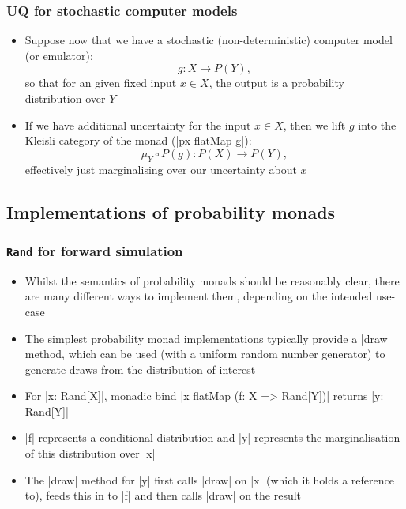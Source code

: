 \documentclass[mathserif,handout]{beamer}
\begin{document}
\begin{frame}[fragile]
  \frametitle{UQ for stochastic computer models}
  \begin{itemize}
  \item Suppose now that we have a stochastic (non-deterministic) computer model (or emulator):
    \[
g: X \longrightarrow P(Y),
\]
so that for an given fixed input $x\in X$, the output is a probability distribution over $Y$
\item If we have additional uncertainty for the input $x\in X$, then we lift $g$ into the Kleisli category of the monad (|px flatMap g|):
  \[
  \mu_Y\circ P(g): P(X) \longrightarrow P(Y),
  \]
  effectively just marginalising over our uncertainty about $x$
  \end{itemize}
\end{frame}

\subsection{Implementations of probability monads}

\begin{frame}[fragile]
  \frametitle{\texttt{Rand} for forward simulation}
  \begin{itemize}
    \item Whilst the semantics of probability monads should be reasonably clear, there are many different ways to implement them, depending on the intended use-case
  \item The simplest probability monad implementations typically provide a |draw| method, which can be used (with a uniform random number generator) to generate draws from the distribution of interest
  \item For |x: Rand[X]|, monadic bind |x flatMap (f: X => Rand[Y])| returns |y: Rand[Y]|
    \item |f| represents a conditional distribution and |y| represents the marginalisation of this distribution over |x|
    \item The |draw| method for |y| first calls |draw| on |x| (which it holds a reference to), feeds this in to |f| and then calls |draw| on the result
    \end{itemize}
\end{frame}
\end{document}
